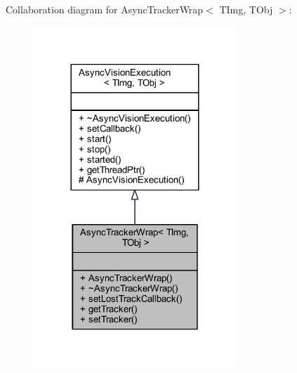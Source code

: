 Collaboration diagram for Async\+Tracker\+Wrap$<$ T\+Img, T\+Obj $>$\+:
\nopagebreak
\begin{figure}[H]
\begin{center}
\leavevmode
\includegraphics[width=216pt]{class_vision_core_1_1_async_1_1_async_tracker_wrap__coll__graph}
\end{center}
\end{figure}
